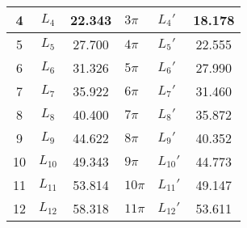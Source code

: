 \documentclass{../template/Report}
\begin{document}
\begin{fullreportonly}
\begin{table}[H]
\begin{tabular}{|c|c|c|C{5em}|C{3em}|c|}
			                                                         & $L_4$                                                                & 22.343                                & $3\pi$                    & $L_4'$                                            & 18.178 \\
			                                                         & $L_5$                                                                & 27.700                                & $4\pi$                    & $L_5'$                                            & 22.555 \\
			                                                         & $L_6$                                                                & 31.326                                & $5\pi$                    & $L_6'$                                            &27.990  \\
			                                                         & $L_7$                                                                & 35.922                                & $6\pi$                    & $L_7'$                                            & 31.460 \\
			                                                         & $L_8$                                                                & 40.400                                & $7\pi$                    & $L_8'$                                            & 35.872 \\
			                                                         & $L_9$                                                                & 44.622                                & $8\pi$                    & $L_9'$                                            & 40.352 \\
			                                                        & $L_{10}$                                                               & 49.343                                & $9\pi$                    & $L_{10}'$                                           & 44.773 \\
			                                                        & $L_{11}$                                                               & 53.814                                & $10\pi$                    & $L_{11}'$                                           & 49.147 \\
			                                                        & $L_{12}$                                                               & 58.318                                & $11\pi$                    & $L_{12}'$                                           & 53.611 \\

\end{tabular}
\end{table}
\end{fullreportonly}
\end{document}
